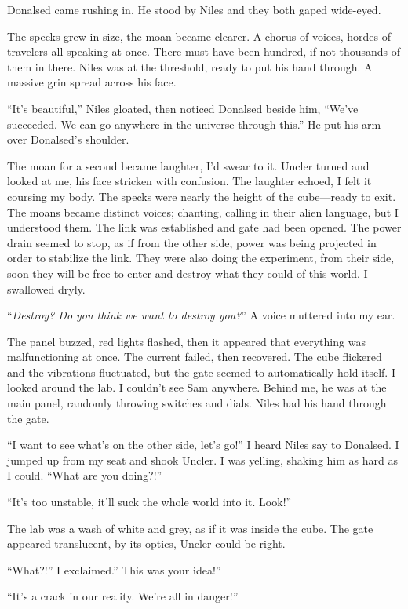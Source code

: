 Donalsed came rushing in. He stood by Niles and they both gaped
wide-eyed.

The specks grew in size, the moan became clearer. A chorus of voices,
hordes of travelers all speaking at once. There must have been hundred,
if not thousands of them in there. Niles was at the threshold, ready to
put his hand through. A massive grin spread across his face.

``It's beautiful,'' Niles gloated, then noticed Donalsed beside him,
``We've succeeded. We can go anywhere in the universe through this.'' He
put his arm over Donalsed's shoulder.

The moan for a second became laughter, I'd swear to it. Uncler turned
and looked at me, his face stricken with confusion. The laughter echoed,
I felt it coursing my body. The specks were nearly the height of the
cube---ready to exit. The moans became distinct voices; chanting,
calling in their alien language, but I understood them. The link was
established and gate had been opened. The power drain seemed to stop, as
if from the other side, power was being projected in order to stabilize
the link. They were also doing the experiment, from their side, soon
they will be free to enter and destroy what they could of this world. I
swallowed dryly.

``\emph{Destroy? Do you think we want to destroy you?}'' A voice
muttered into my ear.

The panel buzzed, red lights flashed, then it appeared that everything
was malfunctioning at once. The current failed, then recovered. The cube
flickered and the vibrations fluctuated, but the gate seemed to
automatically hold itself. I looked around the lab. I couldn't see Sam
anywhere. Behind me, he was at the main panel, randomly throwing
switches and dials. Niles had his hand through the gate.

``I want to see what's on the other side, let's go!'' I heard Niles say
to Donalsed. I jumped up from my seat and shook Uncler. I was yelling,
shaking him as hard as I could. ``What are you doing?!''

``It's too unstable, it'll suck the whole world into it. Look!''

The lab was a wash of white and grey, as if it was inside the cube. The
gate appeared translucent, by its optics, Uncler could be right.

``What?!'' I exclaimed.'' This was your idea!''

``It's a crack in our reality. We're all in danger!''

